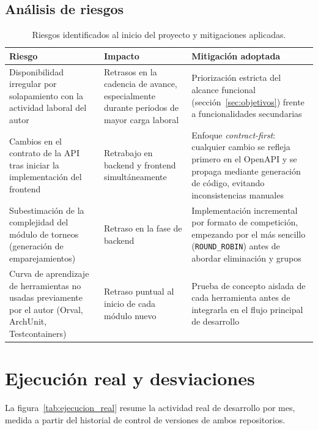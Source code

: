 \subsection{Análisis de riesgos}

\begin{table}[ht]
\centering
\begin{tabularx}{\textwidth}{lXX}
\hline
\textbf{Riesgo} & \textbf{Impacto} & \textbf{Mitigación adoptada} \\
\hline
Disponibilidad irregular por solapamiento con la actividad laboral del autor &
  Retrasos en la cadencia de avance, especialmente durante periodos de
  mayor carga laboral &
  Priorización estricta del alcance funcional (sección~\ref{sec:objetivos})
  frente a funcionalidades secundarias \\
Cambios en el contrato de la API tras iniciar la implementación del frontend &
  Retrabajo en backend y frontend simultáneamente &
  Enfoque \textit{contract-first}: cualquier cambio se refleja primero en el
  OpenAPI y se propaga mediante generación de código, evitando
  inconsistencias manuales \\
Subestimación de la complejidad del módulo de torneos (generación de
  emparejamientos) &
  Retraso en la fase de backend &
  Implementación incremental por formato de competición, empezando por el más
  sencillo (\texttt{ROUND\_ROBIN}) antes de abordar eliminación y grupos \\
Curva de aprendizaje de herramientas no usadas previamente por el autor
  (Orval, ArchUnit, Testcontainers) &
  Retraso puntual al inicio de cada módulo nuevo &
  Prueba de concepto aislada de cada herramienta antes de integrarla en el
  flujo principal de desarrollo \\
\hline
\end{tabularx}
\caption{Riesgos identificados al inicio del proyecto y mitigaciones aplicadas.}
\label{tab:riesgos}
\end{table}

\section{Ejecución real y desviaciones}
\label{sec:ejecucion_real}

La figura~\ref{tab:ejecucion_real} resume la actividad real de desarrollo por
mes, medida a partir del historial de control de versiones de ambos
repositorios.

